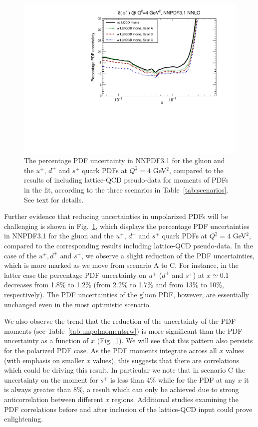 \begin{figure}[!t]
\includegraphics[scale=0.45]{plots/xsp-unpol-lattice-relerr.pdf}
\caption{\small The percentage PDF uncertainty in NNPDF3.1  
  for the gluon and the $u^+$, $d^+$ and $s^+$ quark PDFs at
  $Q^2=4$ GeV$^2$,
  compared to the results of including lattice-QCD pseudo-data for
  moments of PDFs in the fit, according to the three
  scenarios in Table~\ref{tab:scenarios}.
  See text for details.
}    
\label{fig:impactUnpol}
\end{figure}

Further evidence that reducing uncertainties in unpolarized PDFs will be 
challenging is shown in Fig.~\ref{fig:impactUnpol}, which displays the 
percentage PDF uncertainties in NNPDF3.1 for the gluon and the
$u^+$, $d^+$ and $s^+$ quark PDFs at $Q^2=4$ GeV$^2$, compared to the 
corresponding results including lattice-QCD pseudo-data.
%
In the case of the $u^+,d^+$ and $s^+$, we observe a slight reduction
of the PDF uncertainties, which is more marked as we move
from scenario A to C.
%
For instance, in the latter case the percentage PDF
uncertainty on $u^+$ ($d^+$ and $s^+$) at $x\simeq 0.1$
decreases from 1.8\% to 1.2\% (from 2.2\% to 1.7\% and from 13\% to 10\%, 
respectively).
%
The PDF uncertainties of the gluon PDF, however,
are essentially unchanged even in the most optimistic scenario.

We also observe the trend that the reduction of the uncertainty 
of the PDF moments (see Table~\ref{tab:unpolmomentsrw})
is more significant than the PDF uncertainty as a function of $x$  
(Fig.~\ref{fig:impactUnpol}).
%
We will see that this pattern also persists for the polarized PDF case.
%
As the PDF moments integrate across all $x$ values (with emphasis on 
smaller $x$ values), this suggests that there are correlations which could be 
driving this result.
%
In particular we note that in scenario C the uncertainty on the moment for 
$s^+$ is less than $4\%$ while for the PDF at any $x$ it is always greater 
than  $8\%$, a result which can only be achieved due to strong anticorrelation
between different $x$ regions. 
% 
Additional studies examining the PDF correlations before and after inclusion 
of the lattice-QCD input could prove enlightening. 

